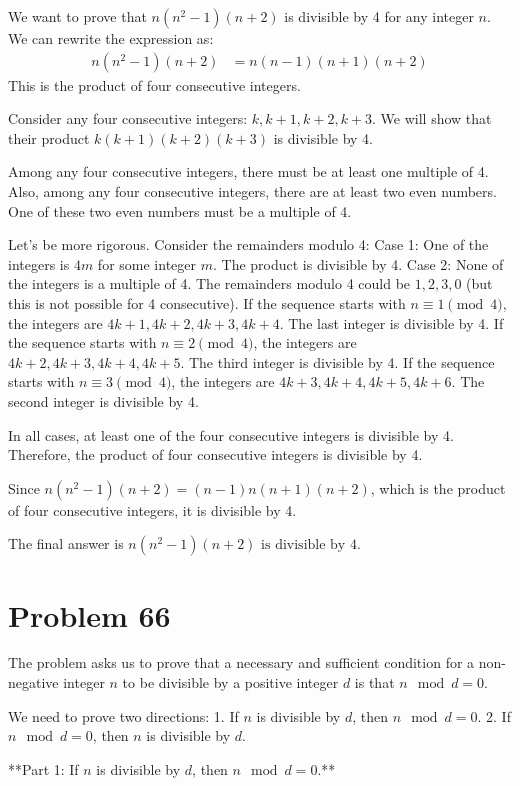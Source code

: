 \documentclass{article}
\begin{document}
We want to prove that $n(n^2 - 1)(n + 2)$ is divisible by 4 for any integer $n$.
We can rewrite the expression as:
\begin{align*} n(n^2 - 1)(n + 2) &= n(n-1)(n+1)(n+2) \end{align*}
This is the product of four consecutive integers.

Consider any four consecutive integers: $k, k+1, k+2, k+3$.
We will show that their product $k(k+1)(k+2)(k+3)$ is divisible by 4.

Among any four consecutive integers, there must be at least one multiple of 4.
Also, among any four consecutive integers, there are at least two even numbers. One of these two even numbers must be a multiple of 4.

Let's be more rigorous.
Consider the remainders modulo 4:
Case 1: One of the integers is $4m$ for some integer $m$. The product is divisible by 4.
Case 2: None of the integers is a multiple of 4. The remainders modulo 4 could be $1, 2, 3, 0$ (but this is not possible for 4 consecutive).
If the sequence starts with $n \equiv 1 \pmod{4}$, the integers are $4k+1, 4k+2, 4k+3, 4k+4$. The last integer is divisible by 4.
If the sequence starts with $n \equiv 2 \pmod{4}$, the integers are $4k+2, 4k+3, 4k+4, 4k+5$. The third integer is divisible by 4.
If the sequence starts with $n \equiv 3 \pmod{4}$, the integers are $4k+3, 4k+4, 4k+5, 4k+6$. The second integer is divisible by 4.

In all cases, at least one of the four consecutive integers is divisible by 4.
Therefore, the product of four consecutive integers is divisible by 4.

Since $n(n^2 - 1)(n + 2) = (n-1)n(n+1)(n+2)$, which is the product of four consecutive integers, it is divisible by 4.

The final answer is $\boxed{n(n^2 - 1)(n + 2) \text{ is divisible by 4}}$.

\newpage

\section*{Problem 66}
The problem asks us to prove that a necessary and sufficient condition for a non-negative integer $n$ to be divisible by a positive integer $d$ is that $n \mod d = 0$.

We need to prove two directions:
1. If $n$ is divisible by $d$, then $n \mod d = 0$.
2. If $n \mod d = 0$, then $n$ is divisible by $d$.

**Part 1: If $n$ is divisible by $d$, then $n \mod d = 0$.**
\end{document}
